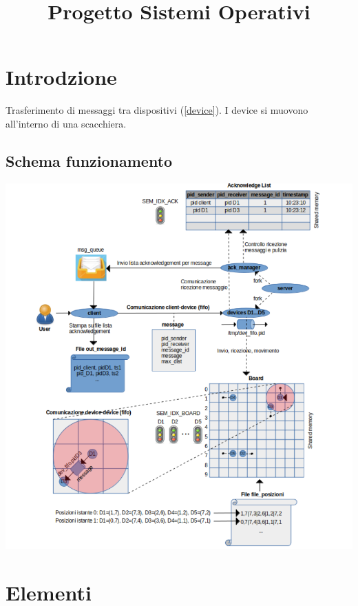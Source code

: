 \documentclass[10pt,a4paper]{article}
\title{Progetto Sistemi Operativi}
\begin{document}
\maketitle
\newpage
\section{Introdzione}
Trasferimento di messaggi tra dispositivi (\ref{device}). I device si muovono all'interno di una scacchiera.
\subsection{Schema funzionamento}
\includegraphics[scale=1.5]{schema}

\section{Elementi}
\end{document}
